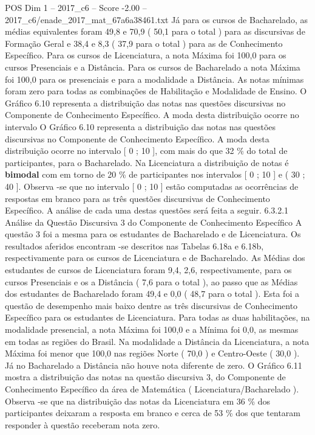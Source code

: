 \begin{textsample}{POS Dim 1 – 2017\_c6 – Score -2.00 – 2017\_c6/enade\_2017\_mat\_67a6a38461.txt}
Já para os cursos de Bacharelado, as médias equivalentes foram 49,8 e 70,9 ( 50,1 para o total ) para as discursivas de Formação Geral e 38,4 e 8,3 ( 37,9 para o total ) para as de Conhecimento Específico.
Para os cursos de Licenciatura, a nota Máxima foi 100,0 para os cursos Presenciais e a Distância.
Para os cursos de Bacharelado a nota Máxima foi 100,0 para os presenciais e para a modalidade a Distância.
As notas mínimas foram zero para todas as combinações de Habilitação e Modalidade de Ensino.
O Gráfico 6.10 representa a distribuição das notas nas questões discursivas no Componente de Conhecimento Específico.
A moda desta distribuição ocorre no intervalo O Gráfico 6.10 representa a distribuição das notas nas questões discursivas no Componente de Conhecimento Específico.
A moda desta distribuição ocorre no intervalo [ 0 ; 10 ], com mais do que 32 \% do total de participantes, para o Bacharelado.
Na Licenciatura a distribuição de notas é \textbf{bimodal} com em torno de 20 \% de participantes nos intervalos [ 0 ; 10 ] e ( 30 ; 40 ].
Observa -se que no intervalo [ 0 ; 10 ] estão computadas as ocorrências de respostas em branco para as três questões discursivas de Conhecimento Específico.
A análise de cada uma destas questões será feita a seguir. 6.3.2.1 Análise da Questão Discursiva 3 do Componente de Conhecimento Específico A questão 3 foi a mesma para os estudantes de Bacharelado e de Licenciatura.
Os resultados aferidos encontram -se descritos nas Tabelas 6.18a e 6.18b, respectivamente para os cursos de Licenciatura e de Bacharelado.
As Médias dos estudantes de cursos de Licenciatura foram 9,4, 2,6, respectivamente, para os cursos Presenciais e os a Distância ( 7,6 para o total ), ao passo que as Médias dos estudantes de Bacharelado foram 49,4 e 0,0 ( 48,7 para o total ).
Esta foi a questão de desempenho mais baixo dentre as três discursivas de Conhecimento Específico para os estudantes de Licenciatura.
Para todas as duas habilitações, na modalidade presencial, a nota Máxima foi 100,0 e a Mínima foi 0,0, as mesmas em todas as regiões do Brasil.
Na modalidade a Distância da Licenciatura, a nota Máxima foi menor que 100,0 nas regiões Norte ( 70,0 ) e Centro-Oeste ( 30,0 ).
Já no Bacharelado a Distância não houve nota diferente de zero.
O Gráfico 6.11 mostra a distribuição das notas na questão discursiva 3, do Componente de Conhecimento Específico da área de Matemática ( Licenciatura/Bacharelado ).
Observa -se que na distribuição das notas da Licenciatura em 36 \% dos participantes deixaram a resposta em branco e cerca de 53 \% dos que tentaram responder à questão receberam nota zero.

\end{textsample}
